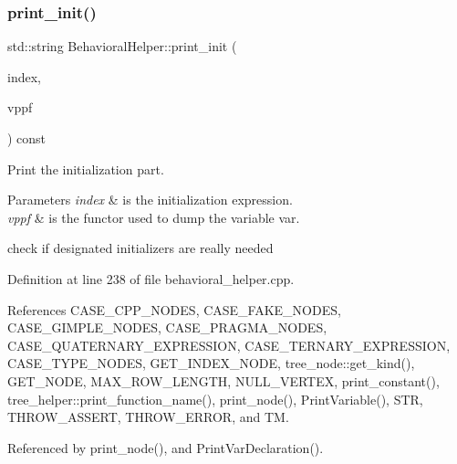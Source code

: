 \subsubsection{\texorpdfstring{print\+\_\+init()}{print\_init()}}
{\footnotesize\ttfamily std\+::string Behavioral\+Helper\+::print\+\_\+init (\begin{DoxyParamCaption}\item[{unsigned int}]{index,  }\item[{const \hyperlink{var__pp__functor_8hpp_a8a6b51b6519401d911398943510557f0}{var\+\_\+pp\+\_\+functor\+Const\+Ref}}]{vppf }\end{DoxyParamCaption}) const\hspace{0.3cm}{\ttfamily [virtual]}}



Print the initialization part. 


\begin{DoxyParams}{Parameters}
{\em index} & is the initialization expression. \\
\hline
{\em vppf} & is the functor used to dump the variable var. \\
\hline
\end{DoxyParams}
check if designated initializers are really needed 

Definition at line 238 of file behavioral\+\_\+helper.\+cpp.



References C\+A\+S\+E\+\_\+\+C\+P\+P\+\_\+\+N\+O\+D\+ES, C\+A\+S\+E\+\_\+\+F\+A\+K\+E\+\_\+\+N\+O\+D\+ES, C\+A\+S\+E\+\_\+\+G\+I\+M\+P\+L\+E\+\_\+\+N\+O\+D\+ES, C\+A\+S\+E\+\_\+\+P\+R\+A\+G\+M\+A\+\_\+\+N\+O\+D\+ES, C\+A\+S\+E\+\_\+\+Q\+U\+A\+T\+E\+R\+N\+A\+R\+Y\+\_\+\+E\+X\+P\+R\+E\+S\+S\+I\+ON, C\+A\+S\+E\+\_\+\+T\+E\+R\+N\+A\+R\+Y\+\_\+\+E\+X\+P\+R\+E\+S\+S\+I\+ON, C\+A\+S\+E\+\_\+\+T\+Y\+P\+E\+\_\+\+N\+O\+D\+ES, G\+E\+T\+\_\+\+I\+N\+D\+E\+X\+\_\+\+N\+O\+DE, tree\+\_\+node\+::get\+\_\+kind(), G\+E\+T\+\_\+\+N\+O\+DE, M\+A\+X\+\_\+\+R\+O\+W\+\_\+\+L\+E\+N\+G\+TH, N\+U\+L\+L\+\_\+\+V\+E\+R\+T\+EX, print\+\_\+constant(), tree\+\_\+helper\+::print\+\_\+function\+\_\+name(), print\+\_\+node(), Print\+Variable(), S\+TR, T\+H\+R\+O\+W\+\_\+\+A\+S\+S\+E\+RT, T\+H\+R\+O\+W\+\_\+\+E\+R\+R\+OR, and TM.



Referenced by print\+\_\+node(), and Print\+Var\+Declaration().

